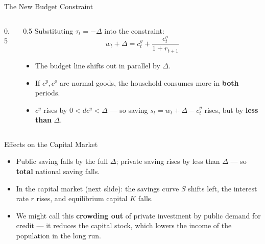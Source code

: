 \documentclass[11pt,aspectratio=169]{beamer}
\begin{document}
\begin{frame}{The New Budget Constraint}
  \begin{columns}[T]
    \begin{column}{0.5\textwidth}
      \begin{center}
      \end{center}
    \end{column}
    \begin{column}{0.5\textwidth}
      \small
      Substituting $\tau_t=-\Delta$ into the constraint:
      \[
        w_t + \Delta = c_t^y + \frac{c_t^o}{1+r_{t+1}}
      \]
      \begin{itemize}
        \item The budget line shifts out in parallel by $\Delta$.
        \item If $c^y, c^o$ are normal goods, the household consumes more in \textbf{both} periods.
        \item $c^y$ rises by $0 < dc^y < \Delta$ --- so saving $s_t = w_t+\Delta-c_t^y$ rises, but by \textbf{less than} $\Delta$.
      \end{itemize}
    \end{column}
  \end{columns}
\end{frame}

\begin{frame}{Effects on the Capital Market}
  \small
  \begin{itemize}
    \item Public saving falls by the full $\Delta$; private saving rises by less than $\Delta$ --- so \textbf{total} national saving falls.
    \item In the capital market (next slide): the savings curve $S$ shifts left, the interest rate $r$ rises, and equilibrium capital $K$ falls.
    \item We might call this \textbf{crowding out} of private investment by public demand for credit --- it reduces the capital stock, which lowers the income of the population in the long run.
  \end{itemize}
\end{frame}
\end{document}

